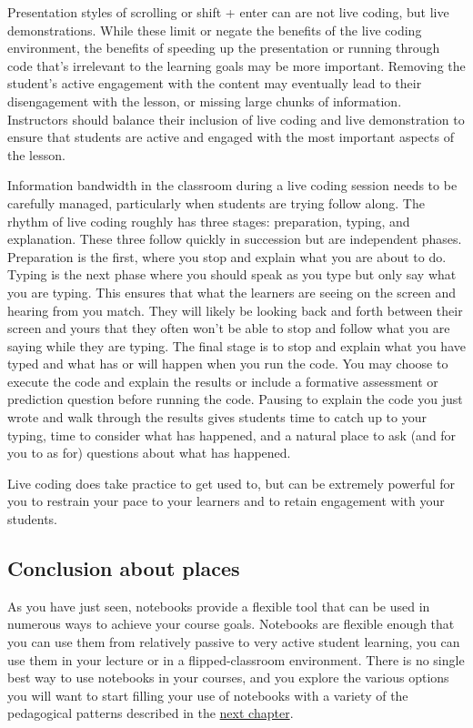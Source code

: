 \documentclass[]{book}
\begin{document}
Presentation styles of scrolling or shift + enter can are not live
coding, but live demonstrations. While these limit or negate the
benefits of the live coding environment, the benefits of speeding up the
presentation or running through code that's irrelevant to the learning
goals may be more important. Removing the student's active engagement
with the content may eventually lead to their disengagement with the
lesson, or missing large chunks of information. Instructors should
balance their inclusion of live coding and live demonstration to ensure
that students are active and engaged with the most important aspects of
the lesson.

Information bandwidth in the classroom during a live coding session
needs to be carefully managed, particularly when students are trying
follow along. The rhythm of live coding roughly has three stages:
preparation, typing, and explanation. These three follow quickly in
succession but are independent phases. Preparation is the first, where
you stop and explain what you are about to do. Typing is the next phase
where you should speak as you type but only say what you are typing.
This ensures that what the learners are seeing on the screen and hearing
from you match. They will likely be looking back and forth between their
screen and yours that they often won't be able to stop and follow what
you are saying while they are typing. The final stage is to stop and
explain what you have typed and what has or will happen when you run the
code. You may choose to execute the code and explain the results or
include a formative assessment or prediction question before running the
code. Pausing to explain the code you just wrote and walk through the
results gives students time to catch up to your typing, time to consider
what has happened, and a natural place to ask (and for you to as for)
questions about what has happened.

Live coding does take practice to get used to, but can be extremely
powerful for you to restrain your pace to your learners and to retain
engagement with your students.

\subsection{Conclusion about places}\label{conclusion-about-places}

As you have just seen, notebooks provide a flexible tool that can be
used in numerous ways to achieve your course goals. Notebooks are
flexible enough that you can use them from relatively passive to very
active student learning, you can use them in your lecture or in a
flipped-classroom environment. There is no single best way to use
notebooks in your courses, and you explore the various options you will
want to start filling your use of notebooks with a variety of the
pedagogical patterns described in the \protect\hyperlink{catalogue}{next
chapter}.
\end{document}
